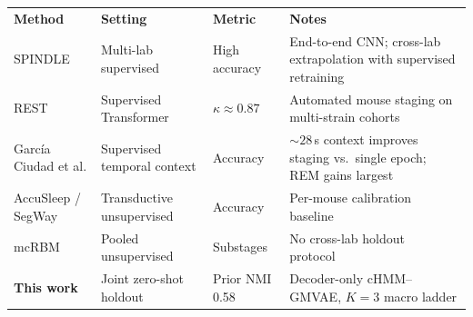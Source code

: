 \begin{tabular}{|l|l|l|p{5.2cm}|}
\hline
\textbf{Method} & \textbf{Setting} & \textbf{Metric} & \textbf{Notes} \\
\thickhline
SPINDLE & Multi-lab supervised & High accuracy & End-to-end CNN; cross-lab extrapolation with supervised retraining~\cite{miladinovic2019spindle} \\
REST & Supervised Transformer & $\kappa \approx 0.87$ & Automated mouse staging on multi-strain cohorts~\cite{wang2026rest} \\
Garc\'ia Ciudad et al. & Supervised temporal context & Accuracy & ${\sim}28$\,s context improves staging vs.\ single epoch; REM gains largest~\cite{garciaciudad2024temporal} \\
AccuSleep / SegWay & Transductive unsupervised & Accuracy & Per-mouse calibration baseline~\cite{barger2019accusleep,yaghouby2016segway} \\
mcRBM & Pooled unsupervised & Substages & No cross-lab holdout protocol~\cite{katsageorgiou2018mcRBM} \\
\textbf{This work} & Joint zero-shot holdout & Prior NMI 0.58 & Decoder-only cHMM--GMVAE, $K{=}3$ macro ladder \\
\hline
\end{tabular}
